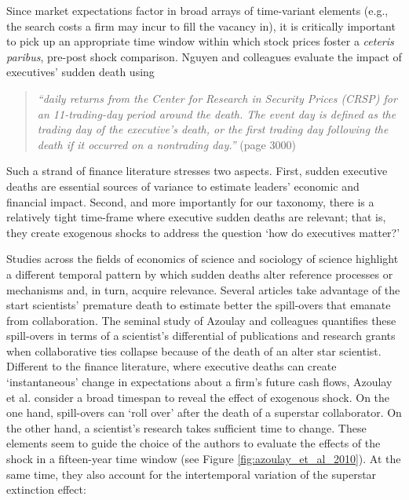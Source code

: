 \documentclass[11pt]{article}
\begin{document}
\begin{refsection}
Since market expectations factor in broad arrays of time-variant elements (e.g.,
the search costs a firm may incur to fill the vacancy in), it is critically
important to pick up an appropriate time window within which stock prices foster
a \textit{ceteris paribus}, pre-post shock comparison. Nguyen and colleagues
\autocite*[][]{nguyen_et_al_2014} evaluate the impact of executives' sudden
death using 

\begin{quote}
  \textit{
    ``daily returns from the Center for Research in Security Prices (CRSP) for
    an 11-trading-day period around the death. The event day is defined as the
    trading day of the executive's death, or the first trading day following
    the death if it occurred on a nontrading day.''
  }
  (page 3000)
\end{quote}

Such a strand of finance literature stresses two aspects. First, sudden
executive deaths are essential sources of variance to estimate leaders' economic
and financial impact.  Second, and more importantly for our taxonomy, there is a
relatively tight time-frame where executive sudden deaths are relevant; that is,
they create exogenous shocks to address the question `how do executives matter?'

Studies across the fields of economics of science and sociology of science
highlight a different temporal pattern by which sudden deaths alter reference
processes or mechanisms and, in turn, acquire relevance. Several articles
\autocites[e.g.,][]{azoulay_et_al_2019_b,azoulay_et_al_2019_a,khanna_et_al_2021,
aizenam_kletzer_2011,azoulay_et_al_2010,oettl_2012} take advantage of the 
start scientists' premature death to estimate better the spill-overs that
emanate from collaboration. The seminal study of Azoulay and colleagues 
\autocite*{azoulay_et_al_2010} quantifies these spill-overs in terms of a
scientist's differential of publications and research grants when collaborative
ties collapse because of the death of an alter star scientist. Different to the
finance literature, where executive deaths can create `instantaneous' change in
expectations about a firm's future cash flows, Azoulay et al.
\autocite{azoulay_et_al_2010} consider a broad timespan to reveal the effect of
exogenous shock. On the one hand, spill-overs can `roll over' after the death of
a superstar collaborator.  On the other hand, a scientist's research takes
sufficient time to change.  These elements seem to guide the choice of the
authors to evaluate the effects of the shock in a fifteen-year time window (see
Figure \ref{fig:azoulay_et_al_2010}). At the same time, they also account for
the intertemporal variation of the superstar extinction effect:


\end{refsection}
\end{document}
